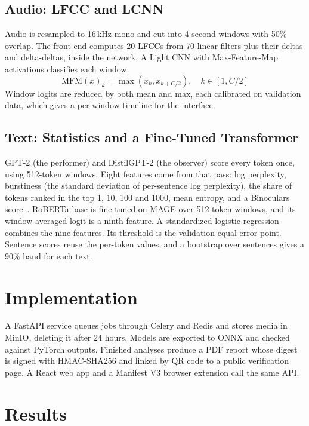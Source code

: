 \documentclass[conference]{IEEEtran}
\begin{document}
\subsection{Audio: LFCC and LCNN}
Audio is resampled to 16\,kHz mono and cut into 4-second windows with 50\% overlap. The front-end computes 20 LFCCs from 70 linear filters plus their deltas and delta-deltas, inside the network. A Light CNN with Max-Feature-Map activations classifies each window:
\begin{equation}
    \text{MFM}(x)_k = \max(x_k, x_{k + C/2}), \quad k \in [1, C/2]
\end{equation}
Window logits are reduced by both mean and max, each calibrated on validation data, which gives a per-window timeline for the interface.

\subsection{Text: Statistics and a Fine-Tuned Transformer}
GPT-2 (the performer) and DistilGPT-2 (the observer) score every token once, using 512-token windows. Eight features come from that pass: log perplexity, burstiness (the standard deviation of per-sentence log perplexity), the share of tokens ranked in the top 1, 10, 100 and 1000, mean entropy, and a Binoculars score~\cite{hans2024binoculars}. RoBERTa-base is fine-tuned on MAGE over 512-token windows, and its window-averaged logit is a ninth feature. A standardized logistic regression combines the nine features. Its threshold is the validation equal-error point. Sentence scores reuse the per-token values, and a bootstrap over sentences gives a 90\% band for each text.

\section{Implementation}

A FastAPI service queues jobs through Celery and Redis and stores media in MinIO, deleting it after 24 hours. Models are exported to ONNX and checked against PyTorch outputs. Finished analyses produce a PDF report whose digest is signed with HMAC-SHA256 and linked by QR code to a public verification page. A React web app and a Manifest V3 browser extension call the same API.

\section{Results}
\end{document}
